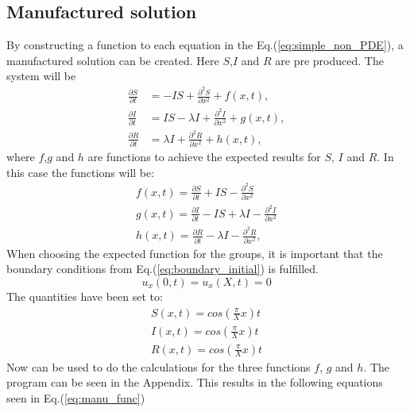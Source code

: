 \documentclass[%
twoside,                 %
final,                   %
chapterprefix=true,      %
open=right               %
10pt]{book}
\begin{document}
\subsection{Manufactured solution}
By constructing a function to each equation in the Eq.(\ref{eq:simple_non_PDE}), a manufactured solution can be created. Here $S$,$I$ and $R$ are pre produced. The system will be
\begin{equation} \label{eq:simple_non_PDE2}
	\begin{aligned}
	\frac{\partial S}{\partial t} &= -IS + \frac{\partial^2 S}{\partial x^2}+f(x,t),\\
	\frac{\partial I}{\partial t} &= IS- \lambda I + \frac{\partial^2 I}{\partial x^2}+g(x,t),\\
	\frac{\partial R}{\partial t} &= \lambda I + \frac{\partial^2 R}{\partial x^2}+h(x,t),
	\end{aligned}
\end{equation}
where $f$,$g$ and $h$ are functions to achieve the expected results for $S$, $I$ and $R$. In this case the functions will be:
\begin{equation}
	\begin{aligned}
	f(x,t) = \frac{\partial S}{\partial t} + IS - \frac{\partial^2 S}{\partial x^2}\\
	g(x,t) = \frac{\partial I}{\partial t} - IS + \lambda I - \frac{\partial^2 I}{\partial x^2}\\
	h(x,t) = \frac{\partial R}{\partial t} -\lambda I - \frac{\partial^2 R}{\partial x^2},
	\end{aligned}
\end{equation}
When choosing the expected function for the groups, it is important that the boundary conditions from Eq.(\ref{eq:boundary_initial}) is fulfilled.
\begin{equation}
    u_x(0,t) = u_x(X,t) = 0
\end{equation}
The quantities have been set to:
\begin{equation}
	\begin{aligned}
    S(x,t) = cos(\frac{\pi}{X}x)t\\
    I(x,t) = cos(\frac{\pi}{X}x)t\\
    R(x,t) = cos(\frac{\pi}{X}x)t
	\end{aligned}
\end{equation}
Now  can be used to do the calculations for the three functions $f$, $g$ and $h$. The program can be seen in the Appendix. This results in the following equations seen in Eq.(\ref{eq:manu_func}) 
\end{document}
